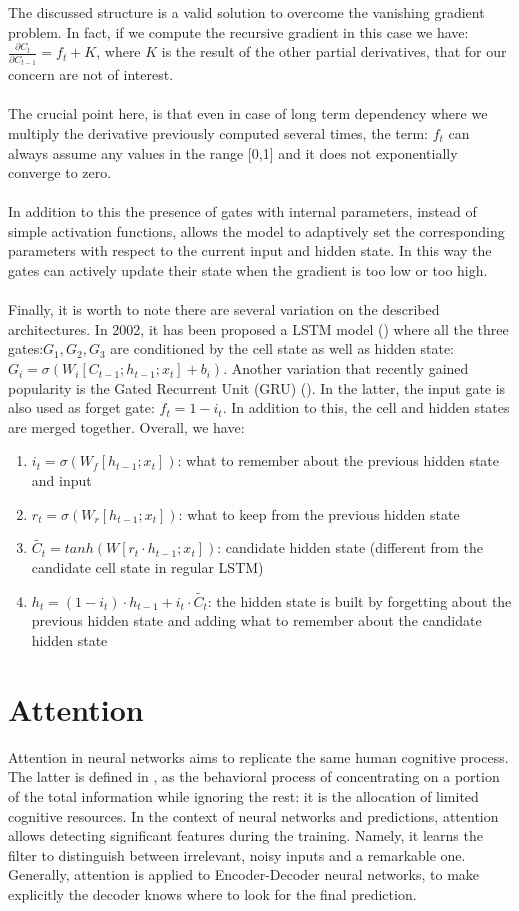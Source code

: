 \documentclass[LaM,binding=0.6cm]{sapthesis}
\begin{document}
The discussed structure is a valid solution to overcome the vanishing gradient problem. In fact, if we compute the recursive gradient in this case we have: $\frac{\partial C_t}{\partial C_{t-1}} = f_t + K$, where $K$ is the result of the other partial derivatives, that for our concern are not of interest.\\\\The crucial point here, is that even in case of long term dependency where we multiply the derivative previously computed several times, the term: $f_t$ can always assume any values in the range [0,1] and it does not exponentially converge to zero.\\\\In addition to this the presence of gates with internal parameters, instead of simple activation functions, allows the model to adaptively set the corresponding parameters with respect to the current input and hidden state. In this way the gates can actively update their state when the gradient is too low or too high.\\\\Finally, it is worth to note there are several variation on the described architectures. In 2002, it has been proposed a LSTM model (\cite{lstmv1}) where all the three gates:$G_1,G_2,G_3$ are conditioned by the cell state as well as hidden state: $G_i=\sigma(W_i[C_{t-1};h_{t-1};x_t]+b_i)$. Another variation that recently gained popularity is the Gated Recurrent Unit (GRU) (\cite{grupaper}). In the latter, the input gate is also used as forget gate: $f_t=1-i_t$. In addition to this, the cell and hidden states are merged together. Overall, we have:
\begin{enumerate}
\item $i_t=\sigma(W_f[h_{t-1};x_t])$: what to remember about the previous hidden state and input
\item $r_t=\sigma(W_r[h_{t-1};x_t])$: what to keep from the previous hidden state  
\item $\widetilde{C_t}=tanh(W [r_t\cdot h_{t-1};x_t])$: candidate hidden state (different from the candidate cell state in regular LSTM)
\item $h_t=(1-i_t)\cdot h_{t-1}+i_t\cdot\widetilde{C_t}$: the hidden state is built by forgetting about the previous hidden state and  adding what to remember about the candidate hidden state
\end{enumerate}
\section{Attention}
Attention in neural networks aims to replicate the same human cognitive process. The latter is defined in \cite{psy}, as the behavioral process of concentrating on a portion of the total information while ignoring the rest: it is the allocation of limited cognitive resources. In the context of neural networks and predictions, attention allows detecting significant features during the training. Namely, it learns the filter to distinguish between irrelevant, noisy inputs and a remarkable one. Generally, attention is applied to Encoder-Decoder neural networks, to make explicitly the decoder knows where to look for the final prediction.
\end{document}
